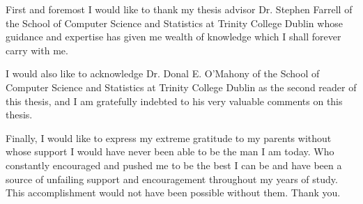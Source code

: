 \documentclass[a4paper, 12pt, oneside]{report}         %
\begin{document}

\thesistitlepage                                  %

\thesisdeclarationpage                %

\thesispermissionpage                 %


\begin{thesisacknowledgments}                     %
First and foremost I would like to thank my thesis advisor Dr. Stephen Farrell of the School of Computer Science and Statistics at Trinity College Dublin whose guidance and expertise has given me wealth of knowledge which I shall forever carry with me.

I would also like to acknowledge Dr. Donal E. O'Mahony of the School of Computer Science and Statistics at Trinity College Dublin as the second reader of this thesis, and I am gratefully indebted to his very valuable comments on this thesis.

Finally, I would like to express my extreme gratitude to my parents without whose support I would have never been able to be the man I am today. Who constantly encouraged and pushed me to be the best I can be and have been a source of unfailing support and encouragement throughout my years of study. This accomplishment would not have been possible without them. Thank you.

\end{thesisacknowledgments}                       %
\end{document}
